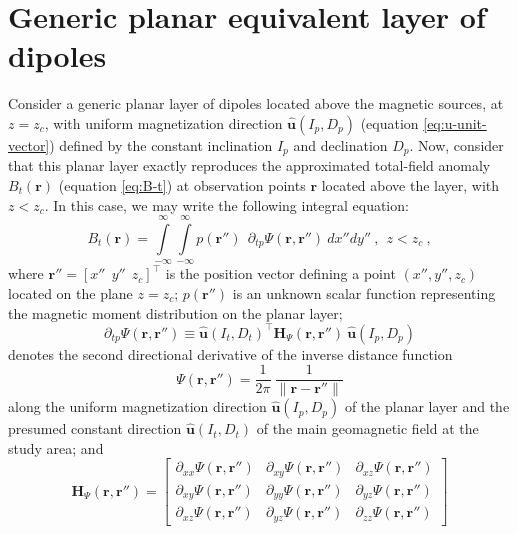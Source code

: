 \section{Generic planar equivalent layer of dipoles}
\label{eq:generic_planar_layer_dipoles}


Consider a generic planar layer of dipoles located above the magnetic sources, at 
$z = z_{c}$,
with uniform magnetization direction $\hat{\mathbf{u}}(I_{p}, D_{p})$ 
(equation \ref{eq:u-unit-vector}) defined by the constant inclination $I_{p}$ and
declination $D_{p}$.
Now, consider that this planar layer exactly reproduces the approximated total-field anomaly
$B_{t}(\mathbf{r})$ (equation \ref{eq:B-t}) at observation points $\mathbf{r}$ 
located above the layer, with $z < z_{c}$. In this case, we may write the following 
integral equation:
\begin{equation}
B_{t}(\mathbf{r}) = 
\int\limits_{-\infty}^{\infty} \int\limits_{-\infty}^{\infty}
p(\mathbf{r}'') \:\: 
\partial_{tp} \Psi(\mathbf{r}, \mathbf{r}'') \: 
dx''dy'' \: , \:\: z < z_{c} \: ,
\label{eq:B-t-generic-layer}
\end{equation}
where $\mathbf{r}'' = \left[x'' \:\: y'' \:\: z_{c} \right]^{\top}$ is the 
position vector defining a point $(x'', y'', z_{c})$ located on the plane 
$z = z_{c}$; $p(\mathbf{r}'')$ is an unknown scalar function representing the 
magnetic moment distribution on the planar layer;
\begin{equation}
\partial_{tp} \Psi(\mathbf{r}, \mathbf{r}'') \equiv
\hat{\mathbf{u}}(I_{t}, D_{t})^{\top} 
\mathbf{H}_{\Psi}(\mathbf{r}, \mathbf{r}'') \: 
\hat{\mathbf{u}}(I_{p}, D_{p}) 
\label{eq:Dtp-Psi}
\end{equation}
denotes the second directional derivative of the inverse distance function
\begin{equation}
\Psi(\mathbf{r}, \mathbf{r}'') = 
\frac{1}{2\pi} \: 
\frac{1}{\| \mathbf{r} - \mathbf{r}'' \|}
\label{eq:Psi}
\end{equation}
along the uniform magnetization direction $\hat{\mathbf{u}}(I_{p}, D_{p})$ of the planar
layer and the presumed constant direction $\hat{\mathbf{u}}(I_{t}, D_{t})$ 
of the main geomagnetic field at the study area; and
\begin{equation}
\mathbf{H}_{\Psi}(\mathbf{r}, \mathbf{r}'') = 
\begin{bmatrix}
\partial_{xx} \Psi(\mathbf{r}, \mathbf{r}'') & 
\partial_{xy} \Psi(\mathbf{r}, \mathbf{r}'') & 
\partial_{xz} \Psi(\mathbf{r}, \mathbf{r}'') \\
\partial_{xy} \Psi(\mathbf{r}, \mathbf{r}'') & 
\partial_{yy} \Psi(\mathbf{r}, \mathbf{r}'') & 
\partial_{yz} \Psi(\mathbf{r}, \mathbf{r}'') \\
\partial_{xz} \Psi(\mathbf{r}, \mathbf{r}'') & 
\partial_{yz} \Psi(\mathbf{r}, \mathbf{r}'') & 
\partial_{zz} \Psi(\mathbf{r}, \mathbf{r}'')
\end{bmatrix}
\label{eq:H-Psi}
\end{equation}
